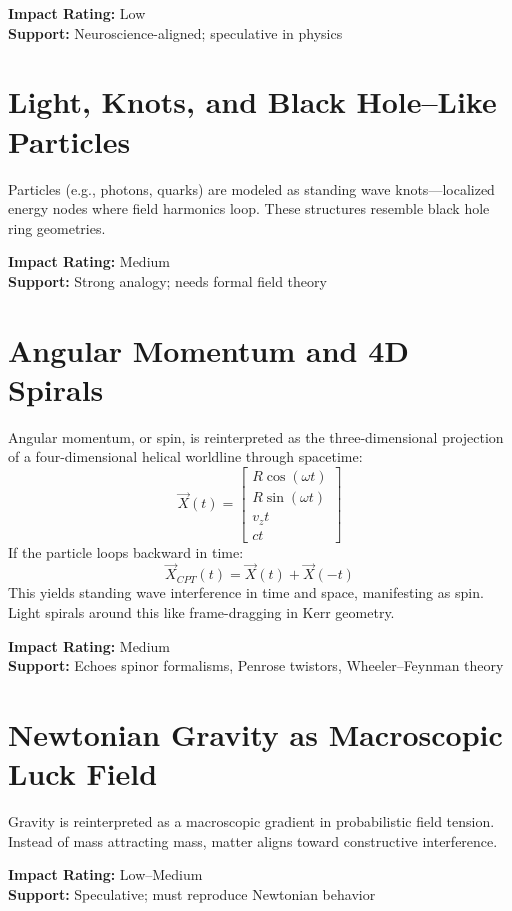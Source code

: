 \documentclass[12pt]{article}
\begin{document}
\textbf{Impact Rating:} Low\\
\textbf{Support:} Neuroscience-aligned; speculative in physics

\section{Light, Knots, and Black Hole--Like Particles}
Particles (e.g., photons, quarks) are modeled as standing wave knots---localized energy nodes where field harmonics loop. These structures resemble black hole ring geometries.

\textbf{Impact Rating:} Medium\\
\textbf{Support:} Strong analogy; needs formal field theory

\section{Angular Momentum and 4D Spirals}
Angular momentum, or spin, is reinterpreted as the three-dimensional projection of a four-dimensional helical worldline through spacetime:
\begin{equation}
 \vec{X}(t) = \begin{bmatrix} R \cos(\omega t) \\ R \sin(\omega t) \\ v_z t \\ ct \end{bmatrix}
\end{equation}
If the particle loops backward in time:
\begin{equation}
 \vec{X}_{CPT}(t) = \vec{X}(t) + \vec{X}(-t)
\end{equation}
This yields standing wave interference in time and space, manifesting as spin. Light spirals around this like frame-dragging in Kerr geometry.

\textbf{Impact Rating:} Medium\\
\textbf{Support:} Echoes spinor formalisms, Penrose twistors, Wheeler--Feynman theory

\section{Newtonian Gravity as Macroscopic Luck Field}
Gravity is reinterpreted as a macroscopic gradient in probabilistic field tension. Instead of mass attracting mass, matter aligns toward constructive interference.

\textbf{Impact Rating:} Low--Medium\\
\textbf{Support:} Speculative; must reproduce Newtonian behavior
\end{document}
